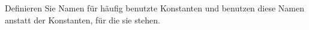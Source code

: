   Definieren Sie Namen für häufig benutzte Konstanten und benutzen diese
  Namen anstatt der Konstanten, für die sie stehen.
